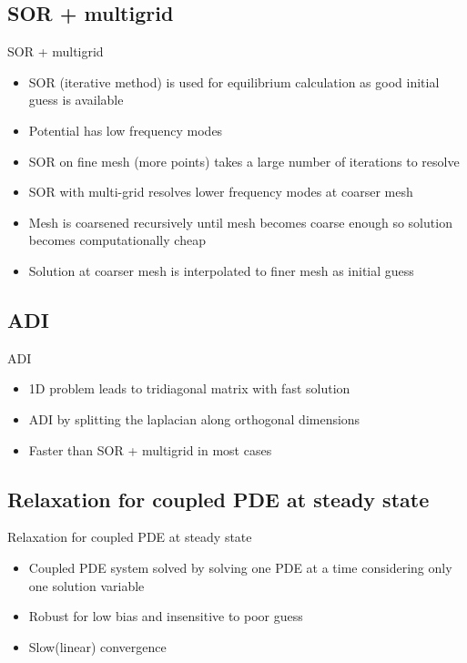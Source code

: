 \documentclass{beamer}
\begin{document}
\subsection{SOR + multigrid}
\begin{frame}{SOR + multigrid}
\begin{itemize}
	\item SOR (iterative method) is used for equilibrium calculation as good initial guess is available
	\item Potential has low frequency modes
	\item SOR on fine mesh (more points) takes a large number of iterations to resolve   
	\item SOR with multi-grid resolves lower frequency modes at coarser mesh
	\item Mesh is coarsened recursively until mesh becomes coarse enough so solution becomes computationally cheap 
	\item Solution at coarser mesh is interpolated to finer mesh as initial guess
\end{itemize}  
\end{frame}

\subsection{ADI}
\begin{frame}{ADI}
\begin{itemize}
	\item 1D problem leads to tridiagonal matrix with fast solution 
	\item ADI by splitting the laplacian along orthogonal dimensions
	\item Faster than SOR + multigrid in most cases
\end{itemize}  
\end{frame}

\subsection{Relaxation for coupled PDE at steady state}
\begin{frame}{Relaxation for coupled PDE at steady state}
\begin{itemize}
	\item Coupled PDE system solved by solving one PDE at a time considering only one solution variable
	\item Robust for low bias and insensitive to poor guess
	\item Slow(linear) convergence
\end{itemize}  
\end{frame}
\end{document}
